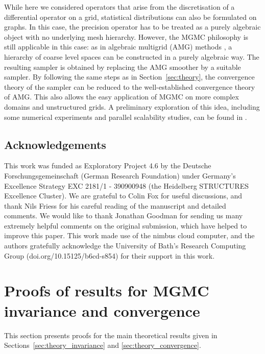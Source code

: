 \documentclass[11pt,english]{article}
\theoremstyle{plain}
\theoremstyle{plain}
\theoremstyle{plain}
\theoremstyle{plain}
\numberwithin{equation}{section}
\newcommand{\rev}[1]{#1}
\newcommand{\jg}[1]{#1}
\begin{document}
\rev{While here we considered operators that arise from the discretisation of a differential operator on a grid, statistical distributions can also be formulated on graphs. In this case, the precision operator has to be treated as a purely algebraic object with no underlying mesh hierarchy. However, the MGMC philosophy is still applicable in this case: as in algebraic multigrid (AMG) methods \cite{ruge1987algebraic,stuben2001review}, a hierarchy of coarse level spaces can be constructed in a purely algebraic way. The resulting sampler is obtained by replacing the AMG smoother by a suitable sampler. By following the same steps as in Section~\ref{sec:theory}, the convergence theory of the sampler can be reduced to the well-established convergence theory of AMG. This also allows the easy application of MGMC on more complex domains and unstructured grids. A preliminary exploration of this idea, including some numerical experiments and parallel scalability studies, can be found in \cite{friess2024}.}
\subsection*{Acknowledgements}
This work was funded as Exploratory Project 4.6 by the Deutsche Forschungsgemeinschaft (German Research Foundation) under Germany's Excellence Strategy EXC 2181/1 - 390900948 (the Heidelberg STRUCTURES Excellence Cluster). We are grateful to Colin Fox for useful discussions, and thank Nils Friess for his careful reading of the manuscript and detailed comments. \jg{We would like to thank Jonathan Goodman for sending us many extremely helpful comments on the original submission, which have helped to improve this paper.} This work made use of the nimbus cloud computer, and the authors gratefully acknowledge the University of Bath's Research Computing Group (doi.org/10.15125/b6cd-s854) for their support in this work.
\printbibliography
\pagebreak
\appendix

\section{Proofs of results for MGMC invariance and convergence\label{subsec:Proofs}}
This section presents proofs for the main theoretical results given in Sections~\ref{sec:theory_invariance} and \ref{sec:theory_convergence}.
\end{document}
